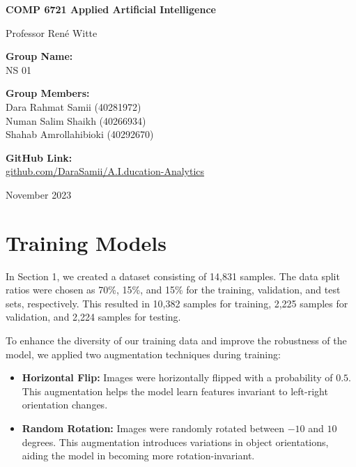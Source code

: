 \documentclass[]{report}
\begin{document}
\begin{titlepage}
	\begin{center}
		\vspace*{1cm}

		
		
		\vspace*{2cm}
		
		\textbf{\Large COMP 6721 Applied Artificial Intelligence}
		
		\vspace{0.5cm}
		Professor René Witte
		
		\vspace{1.5cm}
		\textbf{Group Name:}\\
		NS 01
		\vspace{1.5cm}
		
		\textbf{Group Members:}\\
		Dara Rahmat Samii (40281972)\\ Numan Salim Shaikh (40266934) \\ Shahab Amrollahibioki (40292670)
		
		
		\vfill
		
		\textbf{GitHub Link:}\\
		\href{https://github.com/DaraSamii/A.I.ducation-Analytics}{github.com/DaraSamii/A.I.ducation-Analytics}
		
		\vfill

		
		November 2023
		
	\end{center}
\end{titlepage}
\newpage



\chapter{Training Models}

In Section 1, we created a dataset consisting of 14,831 samples. The data split ratios were chosen as 70\%, 15\%, and 15\% for the training, validation, and test sets, respectively. This resulted in 10,382 samples for training, 2,225 samples for validation, and 2,224 samples for testing.

To enhance the diversity of our training data and improve the robustness of the model, we applied two augmentation techniques during training:

\begin{itemize}
    \item \textbf{Horizontal Flip:} Images were horizontally flipped with a probability of $0.5$. This augmentation helps the model learn features invariant to left-right orientation changes.
    
    \item \textbf{Random Rotation:} Images were randomly rotated between $-10$ and $10$ degrees. This augmentation introduces variations in object orientations, aiding the model in becoming more rotation-invariant.
\end{itemize}
\end{document}
